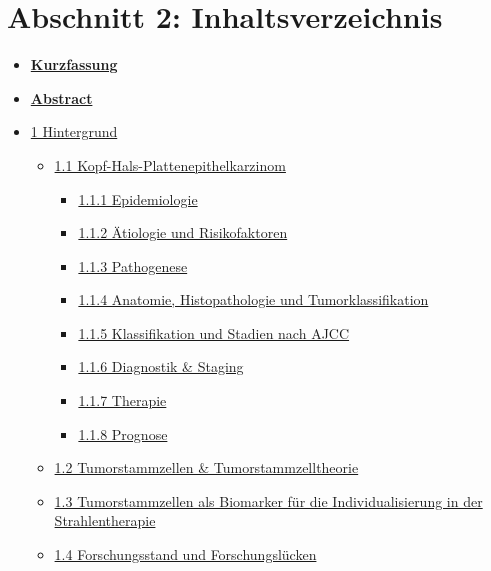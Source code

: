 \hypertarget{abschnitt-2-inhaltsverzeichnis}{%
\section{Abschnitt 2: Inhaltsverzeichnis}\label{abschnitt-2-inhaltsverzeichnis}}

\begin{itemize}
\tightlist
\item
  \protect\hyperlink{kurzfassung}{\textbf{Kurzfassung}}
\item
  \protect\hyperlink{abstract}{\textbf{Abstract}}
\item
  \protect\hyperlink{1-hintergrund}{1 Hintergrund}

  \begin{itemize}
  \tightlist
  \item
    \protect\hyperlink{1-1-kopf-hals-plattenepithelkarzinom}{1.1 Kopf-Hals-Plattenepithelkarzinom}

    \begin{itemize}
    \tightlist
    \item
      \protect\hyperlink{1-1-1-epidemiologie}{1.1.1 Epidemiologie}
    \item
      \protect\hyperlink{1-1-2-uxe4tiologie-und-risikofaktoren}{1.1.2 Ätiologie und Risikofaktoren}
    \item
      \protect\hyperlink{1-1-3-pathogenese}{1.1.3 Pathogenese}
    \item
      \protect\hyperlink{1-1-4-anatomie-histopathologie-und-tumorklassifikation}{1.1.4 Anatomie, Histopathologie und Tumorklassifikation}
    \item
      \protect\hyperlink{1-1-5-klassifikation-und-stadien-nach-ajcc}{1.1.5 Klassifikation und Stadien nach AJCC}
    \item
      \protect\hyperlink{1-1-6-diagnostik-staging}{1.1.6 Diagnostik \& Staging}
    \item
      \protect\hyperlink{1-1-7-therapie}{1.1.7 Therapie}
    \item
      \protect\hyperlink{1-1-8-prognose}{1.1.8 Prognose}
    \end{itemize}
  \item
    \protect\hyperlink{1-2-tumorstammzellen-tumorstammzelltheorie}{1.2 Tumorstammzellen \& Tumorstammzelltheorie}
  \item
    \protect\hyperlink{1-3-tumorstammzellen-als-biomarker-fuxfcr-die-individualisierung-in-der-strahlentherapie}{1.3 Tumorstammzellen als Biomarker für die Individualisierung in der Strahlentherapie}
  \item
    \protect\hyperlink{1-4-forschungsstand-und-forschungsluxfccken}{1.4 Forschungsstand und Forschungslücken}


\end{itemize}
\end{itemize}
